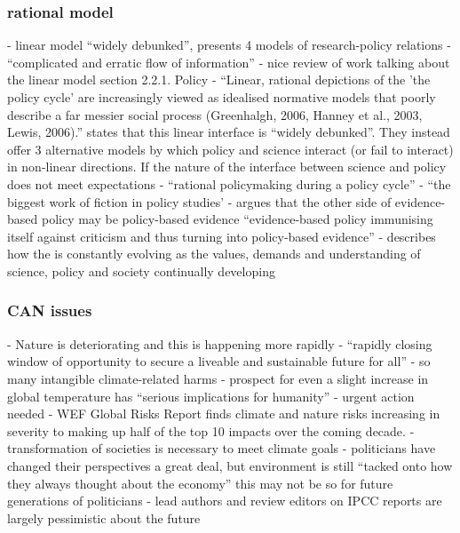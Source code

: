 \subsubsection{rational model}
\cite{BoswellS2017} - linear model ``widely debunked'', presents 4 models of research-policy relations
\cite{BednarekSHG2015} - ``complicated and erratic flow of information''
\cite{McNie2007} - nice review of work talking about the linear model section 2.2.1. Policy
\cite{HaynesDCRHGS2011} - ``Linear, rational depictions of the 'the policy cycle' are increasingly viewed as idealised normative models that poorly describe a far messier social process (Greenhalgh, 2006, Hanney et al., 2003, Lewis, 2006).''
\textcite{BoswellS2017} states that this linear  interface is ``widely debunked''. They instead offer 3 alternative models by which policy and science interact (or fail to interact) in non-linear directions. If the nature of the interface between science and policy does not meet expectations 
\cite{Cairney2018} - ``rational policymaking during a policy cycle'' - ``the biggest work of fiction in policy studies'
\cite{StrassheimK2014} - argues that the other side of evidence-based policy may be policy-based evidence ``evidence-based policy immunising itself against criticism and thus turning into policy-based evidence''
\cite{Obermeister2020} - describes how the \SPI{} is constantly evolving as the values, demands and understanding of science, policy and society continually developing

\subsubsection{CAN issues}
\cite{IPBES2022} - Nature is deteriorating and this is happening more rapidly
\cite{IIPCC2022} - ``rapidly closing window of opportunity to secure a liveable and sustainable future for all''
\cite{TschakertEAKO2019} - so many intangible climate-related harms
\cite{McKayEtAl2022} - prospect for even a slight increase in global temperature has ``serious implications for humanity''  - urgent action needed  
\cite{WEF2024} - WEF Global Risks Report finds climate and nature risks increasing in severity to making up half of the top 10 impacts over the coming decade. 
\cite{LaybournTS2023} - transformation of societies is necessary to meet climate goals
\cite{Killick2023} -  politicians have changed their perspectives a great deal, but environment is still ``tacked onto how they always thought about the economy'' this may not be so for future generations of politicians
\cite{Carrington2024} - lead authors and review editors on IPCC reports are largely pessimistic about the future

